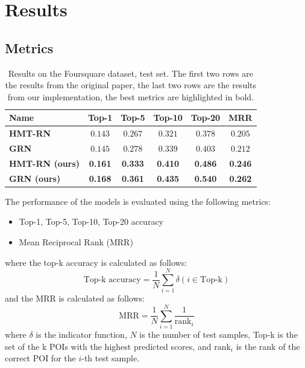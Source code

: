 \documentclass[twocolumn,twoside]{article}
\begin{document}
\section{Results}
\subsection{Metrics}

\begin{table}[ht]
  \caption{Results on the Foursquare dataset, test set. The first two rows are the results from the original paper\cite{main_paper}, the last two rows are the results from our implementation, the best metrics are 
  highlighted in bold.}
  \centering
  \begin{tabularx}{\linewidth}{Xccccc}
    \toprule
    Name & Top-1 & Top-5 & Top-10 & Top-20 & MRR \\
    \midrule
    \midrule
    \textbf{HMT-RN}\cite{main_paper} & $0.143$ & $0.267$ & $0.321$ & $0.378$ & $0.205$ \\
    \textbf{GRN}\cite{main_paper} & $0.145$ & $0.278$ & $0.339$ & $0.403$ & $0.212$ \\
    \midrule
    \midrule
    \textbf{HMT-RN (ours)} & \textbf{0.161} & \textbf{0.333} & \textbf{0.410} & \textbf{0.486} & \textbf{0.246} \\
    \textbf{GRN (ours)} & \textbf{0.168} & \textbf{0.361} & \textbf{0.435} & \textbf{0.540} & \textbf{0.262} \\
    \bottomrule
  \end{tabularx}
  \label{tab:results}
\end{table}

The performance of the models is evaluated using the following metrics:
\begin{itemize}
  \item Top-1, Top-5, Top-10, Top-20 accuracy
  \item Mean Reciprocal Rank (MRR)
\end{itemize}
where the top-k accuracy is calculated as follows:
\begin{equation}
  \text{Top-k accuracy} = \frac{1}{N} \sum_{i=1}^{N} \delta(i \in \text{Top-k})
\end{equation}
and the MRR is calculated as follows:
\begin{equation}
  \text{MRR} = \frac{1}{N} \sum_{i=1}^{N} \frac{1}{\text{rank}_i}
\end{equation}
where $\delta$ is the indicator function, $N$ is the number of test samples, Top-k is the set of the k
POIs with the highest predicted scores,
and $\text{rank}_i$ is the rank of the correct POI for the $i$-th test sample.
\end{document}
